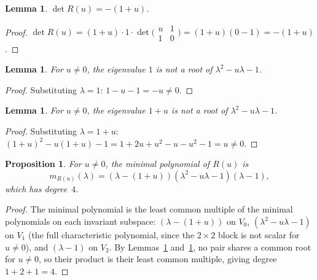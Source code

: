 \documentclass[11pt]{article}
\newtheorem{lemma}[theorem]{Lemma}
\newtheorem{proposition}[theorem]{Proposition}
\theoremstyle{remark}
\begin{document}
\begin{lemma}\label{lem:det}
$\det R(u) = -(1+u)$.
\end{lemma}

\begin{proof}
$\det R(u) = (1+u) \cdot 1 \cdot
\det\bigl(\begin{smallmatrix} u & 1 \\ 1 & 0 \end{smallmatrix}\bigr)
= (1+u)(0-1) = -(1+u)$.
\end{proof}

\begin{lemma}\label{lem:ev1}
For $u \neq 0$, the eigenvalue $1$ is not a root of
$\lambda^2 - u\lambda - 1$.
\end{lemma}

\begin{proof}
Substituting $\lambda = 1$: $1 - u - 1 = -u \neq 0$.
\end{proof}

\begin{lemma}\label{lem:ev1pu}
For $u \neq 0$, the eigenvalue $1+u$ is not a root of
$\lambda^2 - u\lambda - 1$.
\end{lemma}

\begin{proof}
Substituting $\lambda = 1+u$:
$(1+u)^2 - u(1+u) - 1 = 1 + 2u + u^2 - u - u^2 - 1 = u \neq 0$.
\end{proof}

\begin{proposition}\label{prop:minpoly}
For $u \neq 0$, the minimal polynomial of $R(u)$ is
\begin{equation}\label{eq:minpoly}
  m_{R(u)}(\lambda) = (\lambda - (1+u))(\lambda^2 - u\lambda - 1)(\lambda - 1),
\end{equation}
which has degree~$4$.
\end{proposition}

\begin{proof}
The minimal polynomial is the least common multiple of the minimal
polynomials on each invariant subspace:
$(\lambda-(1+u))$ on $V_0$,
$(\lambda^2 - u\lambda - 1)$ on $V_1$ (the full characteristic polynomial,
since the $2 \times 2$ block is not scalar for $u \neq 0$),
and $(\lambda - 1)$ on $V_2$.
By Lemmas~\ref{lem:ev1} and~\ref{lem:ev1pu}, no pair shares a common
root for $u \neq 0$, so their product is their least common multiple,
giving degree $1 + 2 + 1 = 4$.
\end{proof}

\end{document}
